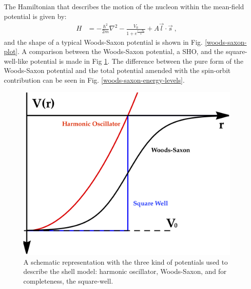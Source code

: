 The Hamiltonian that describes the motion of the nucleon within the mean-field potential is given by:
\begin{align}
    H&=-\frac{\hbar^2}{2m}\nabla^2-\frac{V_0}{1+e^{\frac{r-R_0}{a}}}+A\vec{l}\cdot\vec{s}\ ,
\end{align}
and the shape of a typical Woods-Saxon potential is shown in Fig. \ref{woods-saxon-plot}. A comparison between the Woods-Saxon potential, a SHO, and the square-well-like potential is made in Fig \ref{shell-model-functional-potentials}. The difference between the pure form of the Woods-Saxon potential and the total potential amended with the spin-orbit contribution can be seen in Fig. \ref{woods-saxon-energy-levels}.
\begin{figure}
    \centering
    \includegraphics[scale=0.2]{Chapters/Figures/functional-potentials-shell-model.png}
    \caption{A schematic representation with the three kind of potentials used to describe the shell model: harmonic oscillator, Woods-Saxon, and for completeness, the square-well.}
    \label{shell-model-functional-potentials}
\end{figure}
